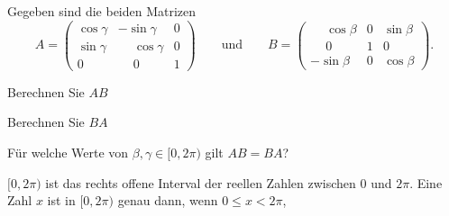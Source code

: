 Gegeben sind die beiden Matrizen
\[
A
=
\begin{pmatrix}
\cos\gamma&         - \sin\gamma&0\\
\sin\gamma&\phantom{-}\cos\gamma&0\\
    0     &\phantom{-}    0     &1
\end{pmatrix}
\qquad\text{und}\qquad
B
=
\begin{pmatrix}
\phantom{-}\cos\beta&0&\sin\beta\\
\phantom{-}    0    &1&    0    \\
         - \sin\beta&0&\cos\beta
\end{pmatrix}.
\]
\begin{teilaufgaben}
\item Berechnen Sie $AB$
\item Berechnen Sie $BA$
\item Für welche Werte von $\beta,\gamma\in[0,2\pi)$ gilt
$AB=BA$?
\end{teilaufgaben}

\begin{hinweis}
$[0,2\pi)$ ist das rechts offene Interval der reellen Zahlen zwischen 
$0$ und $2\pi$.
Eine Zahl $x$ ist in $[0,2\pi)$ genau dann,
wenn $0\le x<2\pi$,
\end{hinweis}

